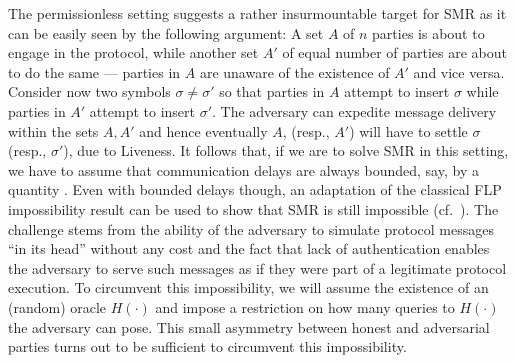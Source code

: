 The permissionless setting suggests a rather insurmountable target for SMR as it can be easily seen by the following argument:
%
A set $A$ of $n$ parties is about to engage in the protocol, while another set $A'$ of equal number of parties are about to do the same --- parties in $A$ are unaware of the existence of $A'$ and vice versa.
%
Consider now two symbols $\sigma \neq \sigma'$ so that parties in $A$ attempt to insert $\sigma$ while parties in $A'$ attempt to insert $\sigma'$.
%
The adversary can expedite message delivery within the sets $A, A'$ and hence  eventually $A$, (resp., $A'$) will have to settle $\sigma$ (resp., $\sigma'$), due to Liveness.
%
It follows that, if we are to solve SMR in this setting, we have to assume that communication delays are always bounded, say, by a quantity \delay.
%
Even with bounded delays though, an adaptation of the classical FLP impossibility result \cite{JACM:FisLynPat85} can be used to show that SMR is still impossible (cf.~\cite{CSF:PasShi17}).
%
The challenge stems from the ability of the adversary to simulate protocol messages ``in its head'' without any cost and the fact that lack of authentication enables the adversary to serve such messages as if they were part of a legitimate protocol execution.
%
To circumvent this impossibility, we will assume the existence of an (random) oracle $H(\cdot)$ and impose a restriction on how many queries to $H(\cdot)$ the adversary can pose.
%
This small asymmetry between honest and adversarial parties turns out to be sufficient to circumvent this impossibility.

